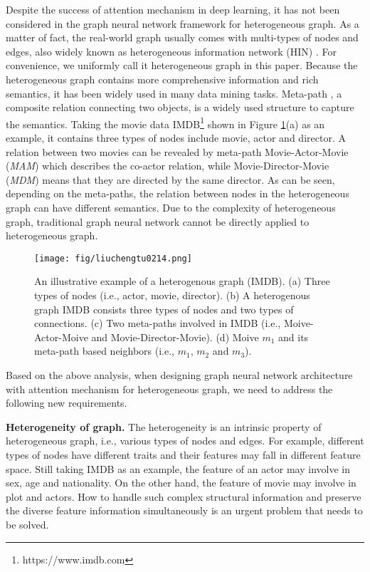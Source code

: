 Despite the success of attention mechanism in deep learning, it has not been considered in the graph neural network framework for heterogeneous graph. As a matter of fact, the real-world graph usually comes with multi-types of nodes and edges, 
also widely known as heterogeneous information network (HIN) \cite{Shi2017ASO}. For convenience, we uniformly call it heterogeneous graph in this paper.
Because the heterogeneous graph contains more comprehensive information and rich semantics, it has been widely used in many data mining tasks. Meta-path \cite{sun2011pathsim}, a composite relation connecting two objects, is a widely used structure to capture the semantics. 
Taking the movie data IMDB\footnote{https://www.imdb.com} shown in Figure \ref{fig_hin}(a) as an example, it contains three types of nodes include movie, actor and director.
A relation between two movies can be revealed by meta-path Movie-Actor-Movie (\emph{MAM}) which describes the co-actor relation,
while Movie-Director-Movie (\emph{MDM}) means that they are directed by the same director.
As can be seen, depending on the meta-paths,
the relation between nodes in the heterogeneous graph can have different semantics.
Due to the complexity of heterogeneous graph, traditional graph neural network cannot be directly applied to heterogeneous graph.
\begin{figure}
\centering
	\texttt{[image: fig/liuchengtu0214.png]}
\caption{
		An illustrative example of a heterogenous graph (IMDB). 
		(a) Three types of nodes (i.e., actor, movie, director).
		(b) A heterogenous graph IMDB  consists three types of nodes  and two types of connections.
		(c) Two meta-paths involved in IMDB (i.e., Moive-Actor-Moive and Movie-Director-Movie). (d) Moive $m_1$ and its meta-path based neighbors (i.e., $m_1$, $m_2$ and $m_3$). 
	}
	\label{fig_hin}
\end{figure}

Based on the above analysis, when designing graph neural network architecture with attention mechanism for heterogeneous graph, 
we need to address the following new requirements.

\textbf{Heterogeneity of graph.}
The heterogeneity is an intrinsic property of heterogeneous graph, i.e., various types of nodes and edges.
For example, different types of nodes have different traits and their features may fall in different feature space. Still taking IMDB as an example, the feature of an actor may involve in sex, age and nationality. On the other hand, the feature of movie may involve in plot and actors. 
How to handle such complex structural information and  preserve the diverse feature information simultaneously is an urgent problem that needs to be solved. 

